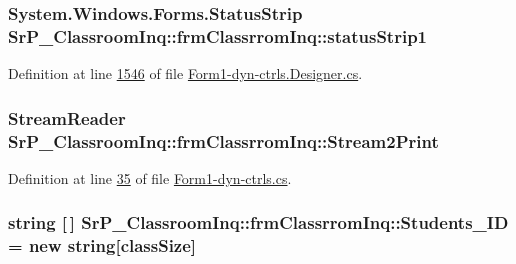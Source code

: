 \hypertarget{class_sr_p___classroom_inq_1_1frm_classrrom_inq_a3d73a45e941d1d5e3ac5a00180dde14a}{
\subsubsection[{status\-Strip1}]{\setlength{\rightskip}{0pt plus 5cm}\-System.\-Windows.\-Forms.\-Status\-Strip {\bf \-Sr\-P\-\_\-\-Classroom\-Inq\-::frm\-Classrrom\-Inq\-::status\-Strip1}}}
\label{class_sr_p___classroom_inq_1_1frm_classrrom_inq_a3d73a45e941d1d5e3ac5a00180dde14a}


\-Definition at line \hyperlink{_form1-dyn-ctrls_8_designer_8cs_source_l01546}{1546} of file \hyperlink{_form1-dyn-ctrls_8_designer_8cs_source}{\-Form1-\/dyn-\/ctrls.\-Designer.\-cs}.

\hypertarget{class_sr_p___classroom_inq_1_1frm_classrrom_inq_aa030f46a7915eae3a0b8b88661be51a8}{
\subsubsection[{\-Stream2\-Print}]{\setlength{\rightskip}{0pt plus 5cm}\-Stream\-Reader {\bf \-Sr\-P\-\_\-\-Classroom\-Inq\-::frm\-Classrrom\-Inq\-::\-Stream2\-Print}}}
\label{class_sr_p___classroom_inq_1_1frm_classrrom_inq_aa030f46a7915eae3a0b8b88661be51a8}


\-Definition at line \hyperlink{_form1-dyn-ctrls_8cs_source_l00035}{35} of file \hyperlink{_form1-dyn-ctrls_8cs_source}{\-Form1-\/dyn-\/ctrls.\-cs}.

\hypertarget{class_sr_p___classroom_inq_1_1frm_classrrom_inq_a68a93f6247168ebfa500f7afe83cce94}{
\subsubsection[{\-Students\-\_\-\-I\-D}]{\setlength{\rightskip}{0pt plus 5cm}string \mbox{[}$\,$\mbox{]} {\bf \-Sr\-P\-\_\-\-Classroom\-Inq\-::frm\-Classrrom\-Inq\-::\-Students\-\_\-\-I\-D} = new string\mbox{[}{\bf class\-Size}\mbox{]}}}
\label{class_sr_p___classroom_inq_1_1frm_classrrom_inq_a68a93f6247168ebfa500f7afe83cce94}


